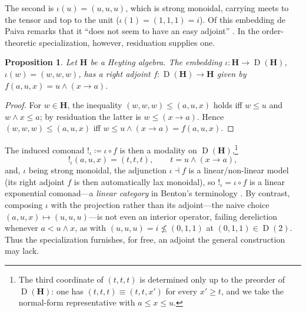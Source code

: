 \documentclass[reqno]{amsart}
\theoremstyle{plain}
\newtheorem{prop}[thm]{Proposition}
\theoremstyle{definition}
\DeclareMathOperator{\D}{D}
\newcommand{\cf}[1]{\mathbf{#1}}
\begin{document}
The second is $ \iota(u) = (u,u,u) $, which is strong monoidal, carrying meets to the tensor and top to the unit ($ \iota(1) = (1,1,1) = i $). Of this embedding de Paiva remarks that it ``does not seem to have an easy adjoint'' \cite[\S1.4]{dePaiva1991}. In the order-theoretic specialization, however, residuation supplies one.
\begin{prop}\label{prop: G adjoint}
    Let $ \cf{H} $ be a Heyting algebra. The embedding $ \iota \colon \cf{H} \to \D(\cf{H}) $, $ \iota(w) = (w,w,w) $, has a right adjoint $ f \colon \D(\cf{H}) \to \cf{H} $ given by $ f(a,u,x) = u \wedge (x \rightarrow a) $.
\end{prop}
\begin{proof}
    For $ w \in \cf{H} $, the inequality $ (w,w,w) \leq (a,u,x) $ holds iff $ w \leq u $ and $ w \wedge x \leq a $; by residuation the latter is $ w \leq (x \rightarrow a) $. Hence $ (w,w,w) \leq (a,u,x) $ iff $ w \leq u \wedge (x \rightarrow a) = f(a,u,x) $.
\end{proof}
The induced comonad $ {!}_{\iota} \coloneqq \iota \circ f $ is then a modality on $ \D(\cf{H}) $,\footnote{The third coordinate of $ (t,t,t) $ is determined only up to the preorder of $ \D(\cf{H}) $: one has $ (t,t,t) \equiv (t,t,x') $ for every $ x' \geq t $, and we take the normal-form representative with $ a \leq x \leq u $.}
\begin{equation*}
    {!}_{\iota}(a,u,x) = (t,t,t), \qquad t = u \wedge (x \rightarrow a),
\end{equation*}
and, $ \iota $ being strong monoidal, the adjunction $ \iota \dashv f $ is a linear/non-linear model (its right adjoint $ f $ is then automatically lax monoidal), so $ {!}_{\iota} = \iota \circ f $ is a linear exponential comonad---a \emph{linear category} in Benton's terminology \cite[Cor.~8]{benton1994}. By contrast, composing $ \iota $ with the projection rather than its adjoint---the naive choice $ (a,u,x) \mapsto (u,u,u) $---is not even an interior operator, failing dereliction whenever $ a < u \wedge x $, as with $ (u,u,u) = i \nleq (0,1,1) $ at $ (0,1,1) \in \D(2) $. Thus the specialization furnishes, for free, an adjoint the general construction may lack.
\end{document}
